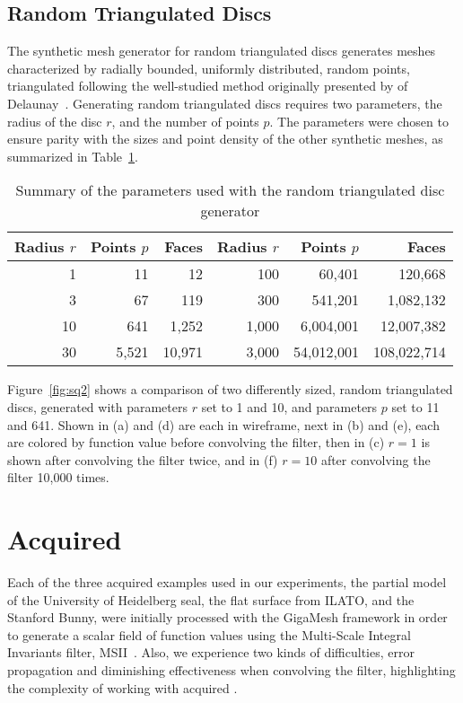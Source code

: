 \subsection{Random Triangulated Discs}
\label{ch6sSTDDssRTD}
The synthetic mesh generator for random triangulated discs generates meshes characterized by radially bounded, uniformly distributed, random points,  triangulated following the well-studied method originally presented by of Delaunay~\cite{Delaunay34}. Generating random triangulated discs requires two parameters, the radius of the disc $r$, and the number of points $p$. The parameters were chosen to ensure parity with the sizes and point density of the other synthetic meshes, as summarized in Table~\ref{tbl:rdisc}.
\vspace*{-.5\baselineskip}
\begin{table}[ht]
\begin{tabular}{rrr|rrr}
\textbf{Radius $r$} & \textbf{Points $p$} & \textbf{Faces} & \textbf{Radius $r$} & \textbf{Points $p$} & \textbf{Faces}\\
\hline
    1 &         11 &          12 &   100 &     60,401 &     120,668\\
    3 &         67 &         119 &   300 &    541,201 &   1,082,132\\
   10 &        641 &       1,252 & 1,000 &  6,004,001 &  12,007,382\\
   30 &      5,521 &      10,971 & 3,000 & 54,012,001 & 108,022,714%
\caption{Summary of the parameters used with the random triangulated disc generator\label{tbl:rdisc}}
\end{tabular}
\end{table}

Figure~\ref{fig:sq2} shows a comparison of two differently sized, random triangulated discs, generated with parameters $r$ set to 1 and 10, and parameters $p$ set to 11 and 641. Shown in (a) and (d) are each in wireframe, next in (b) and (e), each are colored by function value before convolving the filter, then in (c) $r=1$ is shown after convolving the filter twice, and in (f) $r=10$ after convolving the filter 10,000 times.

\vspace*{-\baselineskip}


%
%
%
%
%
%
\pagebreak
\section{Acquired \tdd{}}
\label{ch6sATDD}
Each of the three acquired \tdd{} examples used in our experiments, the partial model of the University of Heidelberg seal, the flat surface from ILATO, and the Stanford Bunny, were initially processed with the GigaMesh framework in order to generate a scalar field of function values using the Multi-Scale Integral Invariants filter, MSII~\cite{Mara12}. Also, we experience two kinds of difficulties, error propagation and diminishing effectiveness when convolving the filter, highlighting the complexity of working with acquired \tdd{}.

